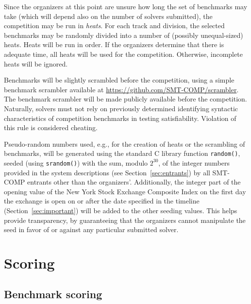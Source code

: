 \documentclass[12pt]{article}
\begin{document}
%
Since the organizers at this point are unsure how long the set of
benchmarks may take (which will depend also on the number of solvers
submitted), the competition may be run in \emph{heats}.  For each
track and division, the selected benchmarks may be randomly divided
into a number of (possibly unequal-sized) heats.  Heats will be run in
order.  If the organizers determine that there is adequate time, all
heats will be used for the competition.  Otherwise, incomplete heats
will be ignored.

%
Benchmarks will be slightly scrambled before the competition, using a simple
benchmark scrambler available at \url{https://github.com/SMT-COMP/scrambler}.
The benchmark scrambler will be made publicly available before the competition.
%
Naturally, solvers must not rely on previously determined identifying
syntactic characteristics of competition benchmarks in testing
satisfiability.  Violation of this rule is considered cheating.

%
Pseudo-random numbers used, e.g., for the creation of heats or the
scrambling of benchmarks, will be generated using the standard C
library function \texttt{random()}, seeded (using \texttt{srandom()})
with the sum, modulo $2^{30}$, of the integer numbers provided in the
system descriptions (see Section~\ref{sec:entrants}) by all SMT-COMP
entrants other than the organizers'.  Additionally, the integer part
of the opening value of the New York Stock Exchange Composite Index on
the first day the exchange is open on or after the date specified in
the timeline (Section~\ref{sec:important}) will be added to the other
seeding values.  This helps provide transparency, by guaranteeing that
the organizers cannot manipulate the seed in favor of or against any
particular submitted solver.


\section{Scoring}
\label{sec:scoring}

\subsection{Benchmark scoring}
\label{sec:benchmark-scoring}
\end{document}
